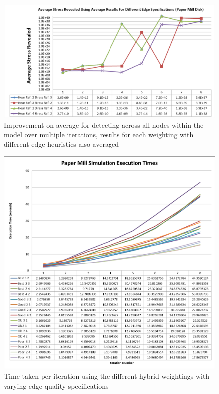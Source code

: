 \begin{figure}[H]
  \centerline{\includegraphics[width=120mm, scale=0.5]{../Graphics/PaperMill/AverageStress.png}}
  \caption{Improvement on average for detecting across all nodes within the model over multiple iterations, results for each weighting with different edge heuristics also averaged}
\end{figure}



\begin{figure}[H]
  \centerline{\includegraphics[width=120mm, scale=0.5]{../Graphics/PaperMill/PaperMillExecutionTimes.png}}
  \caption{Time taken per iteration using the different hybrid weightings with varying edge quality specifications}
\end{figure}



